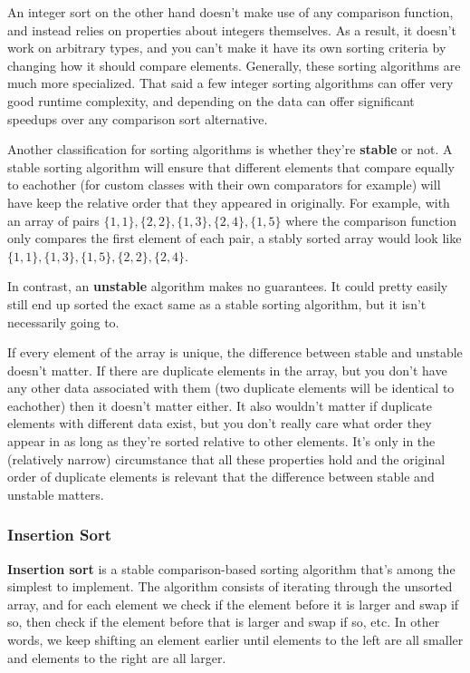An integer sort on the other hand doesn't make use of any comparison function, and instead relies on properties about integers themselves. As a result, it doesn't work on arbitrary types, and you can't make it have its own sorting criteria by changing how it should compare elements. Generally, these sorting algorithms are much more specialized. That said a few integer sorting algorithms can offer very good runtime complexity, and depending on the data can offer significant speedups over any comparison sort alternative.

Another classification for sorting algorithms is whether they're \textbf{stable} or not. A stable sorting algorithm will ensure that different elements that compare equally to eachother (for custom classes with their own comparators for example) will have keep the relative order that they appeared in originally. For example, with an array of pairs $\{1,1\}, \{2,2\}, \{1,3\}, \{2,4\}, \{1,5\}$ where the comparison function only compares the first element of each pair, a stably sorted array would look like $\{1,1\}, \{1,3\}, \{1,5\}, \{2,2\}, \{2,4\}$.

In contrast, an \textbf{unstable} algorithm makes no guarantees. It could pretty easily still end up sorted the exact same as a stable sorting algorithm, but it isn't necessarily going to.

If every element of the array is unique, the difference between stable and unstable doesn't matter. If there are duplicate elements in the array, but you don't have any other data associated with them (two duplicate elements will be identical to eachother) then it doesn't matter either. It also wouldn't matter if duplicate elements with different data exist, but you don't really care what order they appear in as long as they're sorted relative to other elements. It's only in the (relatively narrow) circumstance that all these properties hold and the original order of duplicate elements is relevant that the difference between stable and unstable matters.

\subsubsection{Insertion Sort}

\textbf{Insertion sort} is a stable comparison-based sorting algorithm that's among the simplest to implement. The algorithm consists of iterating through the unsorted array, and for each element we check if the element before it is larger and swap if so, then check if the element before that is larger and swap if so, etc. In other words, we keep shifting an element earlier until elements to the left are all smaller and elements to the right are all larger.

